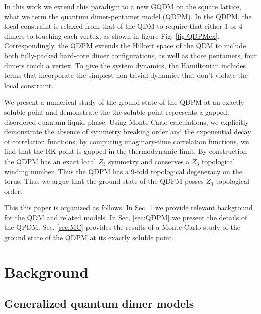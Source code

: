 \documentclass[twocolumn,prb,aps,floatfix,superscriptaddress]{revtex4-1}
\newcommand{\figref}[1]{Fig. \ref{#1}}
\newcommand{\secref}[1]{Sec. \ref{#1}}
\begin{document}
In this work we extend this paradigm to a new GQDM on the square lattice, what we term the quantum dimer-pentamer model (QDPM). In the QDPM, the local constraint is relaxed from that of the QDM to require that either $1$ or $4$ dimers to touching each vertex, as shown in figure \figref{fig:QDPMex}. Correspondingly, the QDPM extends the Hilbert space of the QDM to include both fully-packed hard-core dimer configurations, as well as those pentamers, four dimers touch a vertex. To give the system dynamics, the Hamiltonian includes terms that incorporate the simplest non-trivial dynamics that don't violate the local constraint.

We present a numerical study of the ground state of the QDPM at an exactly soluble point and demonstrate the the soluble point represents a gapped, disordered quantum liquid phase.  Using Monte Carlo calculations, we explicitly demonstrate the absence of symmetry breaking order and the exponential decay of correlation functions; by computing imaginary-time correlation functions, we find that the RK point is gapped in the thermodynamic limit. By construction the QDPM has an exact local $Z_3$ symmetry and conserves a $Z_3$ topological winding number. Thus the QDPM has a 9-fold topological degeneracy on the torus. Thus we argue that the ground state of the QDPM posses $Z_3$ topological order.

This this paper is organized as follows. In \secref{sec:Background} we provide relevant background for the QDM and related models. In \secref{sec:QDPM} we present the details of the QPDM. \secref{sec:MC} provides the results of a Monte Carlo study of the ground state of the QDPM at its exactly soluble point.


\section{Background}
\label{sec:Background}

\subsection{Generalized quantum dimer models}
\label{sec:GQDM}
\end{document}
